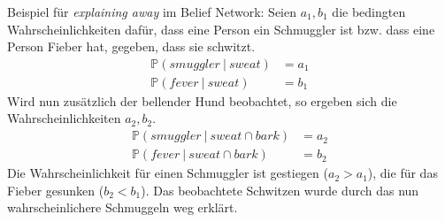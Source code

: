 \documentclass[a4paper]{scrartcl}
\newcommand{\prob}{\mathbb{P}}
\begin{document}
Beispiel für \emph{explaining away} im Belief Network:
Seien $a_1,b_1$ die bedingten Wahrscheinlichkeiten dafür, dass eine Person ein
Schmuggler ist bzw. dass eine Person Fieber hat, gegeben, dass sie schwitzt.
\begin{align*}
    \prob(smuggler\ |\ sweat) &= a_1 \\
    \prob(fever\ |\ sweat) &= b_1
\end{align*}
Wird nun zusätzlich der bellender Hund beobachtet, so ergeben sich die
Wahrscheinlichkeiten $a_2, b_2$.
\begin{align*}
    \prob(smuggler\ |\ sweat \cap bark) &= a_2 \\
    \prob(fever\ |\ sweat \cap bark) &= b_2
\end{align*}
Die Wahrscheinlichkeit für einen Schmuggler ist gestiegen ($a_2 > a_1$), die
für das Fieber gesunken ($b_2 < b_1$). Das beobachtete Schwitzen wurde durch
das nun wahrscheinlichere Schmuggeln weg erklärt.
\end{document}
